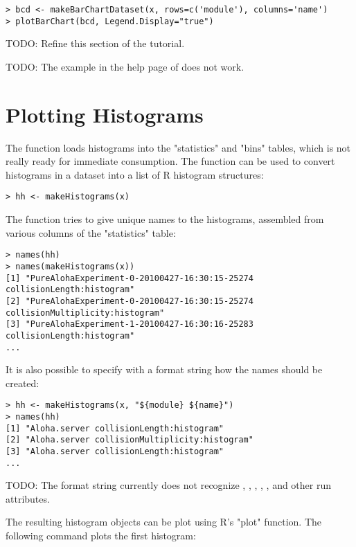 \begin{verbatim}
> bcd <- makeBarChartDataset(x, rows=c('module'), columns='name')
> plotBarChart(bcd, Legend.Display="true")
\end{verbatim}

TODO: Refine this section of the tutorial.

TODO: The example in the help page of  does not work.


\section{Plotting Histograms}

The  function loads histograms into the "statistics" and "bins" tables,
which is not really ready for immediate consumption. The  function
can be used to convert histograms in a dataset into a list of R histogram structures:

\begin{verbatim}
> hh <- makeHistograms(x)
\end{verbatim}

The function tries to give unique names to the histograms, assembled from various columns
of the "statistics" table:

\begin{verbatim}
> names(hh)
> names(makeHistograms(x))
[1] "PureAlohaExperiment-0-20100427-16:30:15-25274 collisionLength:histogram"
[2] "PureAlohaExperiment-0-20100427-16:30:15-25274 collisionMultiplicity:histogram"
[3] "PureAlohaExperiment-1-20100427-16:30:16-25283 collisionLength:histogram"
...
\end{verbatim}

It is also possible to specify with a format string how the names should be created:

\begin{verbatim}
> hh <- makeHistograms(x, "${module} ${name}")
> names(hh)
[1] "Aloha.server collisionLength:histogram"      
[2] "Aloha.server collisionMultiplicity:histogram"
[3] "Aloha.server collisionLength:histogram"      
...
\end{verbatim}

TODO: The format string currently does not recognize , 
, , ,
,  and other run attributes.

The resulting histogram objects can be plot using R's "plot" function. The
following command plots the first histogram:

